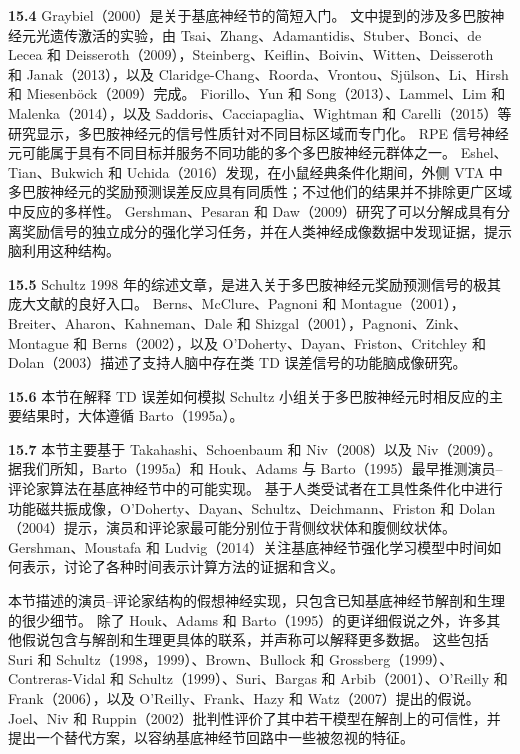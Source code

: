 \documentclass[UTF8,12pt,a4paper,fontset=fandol]{ctexart}
\begin{document}
\noindent\textbf{15.4}
Graybiel（2000）是关于基底神经节的简短入门。
文中提到的涉及多巴胺神经元光遗传激活的实验，由 Tsai、Zhang、Adamantidis、Stuber、Bonci、de Lecea 和 Deisseroth（2009），Steinberg、Keiflin、Boivin、Witten、Deisseroth 和 Janak（2013），以及 Claridge-Chang、Roorda、Vrontou、Sjülson、Li、Hirsh 和 Miesenböck（2009）完成。
Fiorillo、Yun 和 Song（2013）、Lammel、Lim 和 Malenka（2014），以及 Saddoris、Cacciapaglia、Wightman 和 Carelli（2015）等研究显示，多巴胺神经元的信号性质针对不同目标区域而专门化。
RPE 信号神经元可能属于具有不同目标并服务不同功能的多个多巴胺神经元群体之一。
Eshel、Tian、Bukwich 和 Uchida（2016）发现，在小鼠经典条件化期间，外侧 VTA 中多巴胺神经元的奖励预测误差反应具有同质性；不过他们的结果并不排除更广区域中反应的多样性。
Gershman、Pesaran 和 Daw（2009）研究了可以分解成具有分离奖励信号的独立成分的强化学习任务，并在人类神经成像数据中发现证据，提示脑利用这种结构。

\noindent\textbf{15.5}
Schultz 1998 年的综述文章，是进入关于多巴胺神经元奖励预测信号的极其庞大文献的良好入口。
Berns、McClure、Pagnoni 和 Montague（2001），Breiter、Aharon、Kahneman、Dale 和 Shizgal（2001），Pagnoni、Zink、Montague 和 Berns（2002），以及 O'Doherty、Dayan、Friston、Critchley 和 Dolan（2003）描述了支持人脑中存在类 TD 误差信号的功能脑成像研究。

\noindent\textbf{15.6}
本节在解释 TD 误差如何模拟 Schultz 小组关于多巴胺神经元时相反应的主要结果时，大体遵循 Barto（1995a）。

\noindent\textbf{15.7}
本节主要基于 Takahashi、Schoenbaum 和 Niv（2008）以及 Niv（2009）。
据我们所知，Barto（1995a）和 Houk、Adams 与 Barto（1995）最早推测演员--评论家算法在基底神经节中的可能实现。
基于人类受试者在工具性条件化中进行功能磁共振成像，O'Doherty、Dayan、Schultz、Deichmann、Friston 和 Dolan（2004）提示，演员和评论家最可能分别位于背侧纹状体和腹侧纹状体。
Gershman、Moustafa 和 Ludvig（2014）关注基底神经节强化学习模型中时间如何表示，讨论了各种时间表示计算方法的证据和含义。

本节描述的演员--评论家结构的假想神经实现，只包含已知基底神经节解剖和生理的很少细节。
除了 Houk、Adams 和 Barto（1995）的更详细假说之外，许多其他假说包含与解剖和生理更具体的联系，并声称可以解释更多数据。
这些包括 Suri 和 Schultz（1998，1999）、Brown、Bullock 和 Grossberg（1999）、Contreras-Vidal 和 Schultz（1999）、Suri、Bargas 和 Arbib（2001）、O'Reilly 和 Frank（2006），以及 O'Reilly、Frank、Hazy 和 Watz（2007）提出的假说。
Joel、Niv 和 Ruppin（2002）批判性评价了其中若干模型在解剖上的可信性，并提出一个替代方案，以容纳基底神经节回路中一些被忽视的特征。
\end{document}
